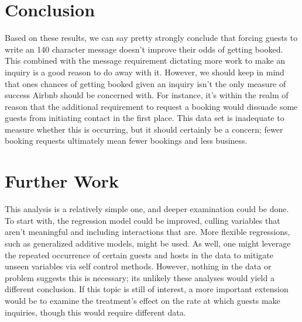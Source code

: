 \documentclass[11pt]{article}
\theoremstyle{definition}
\begin{document}
\section{Conclusion}
Based on these results, we can say pretty strongly conclude that forcing guests to write an 140 character message doesn't improve their odds of getting booked. This combined with the message requirement dictating more work to make an inquiry is a good reason to do away with it. However, we should keep in mind that ones chances of getting booked given an inquiry isn't the only measure of success Airbnb should be concerned with. For instance, it's within the realm of reason that the additional requirement to request a booking would dissuade some guests from initiating contact in the first place. This data set is inadequate to measure whether this is occurring, but it should certainly be a concern; fewer booking requests ultimately mean fewer bookings and less business.

\section{Further Work}
This analysis is a relatively simple one, and deeper examination could be done.  To start with, the regression model could be improved, culling variables that aren't meaningful and including interactions that are. More flexible regressions, such as generalized additive models, might be used. As well, one might leverage the repeated occurrence of certain guests and hosts in the data to mitigate unseen variables via self control methods. However, nothing in the data or problem suggests this is necessary; its unlikely these analyses would yield a different conclusion. If this topic is still of interest, a more important extension would be to examine the treatment's effect on the rate at which guests make inquiries, though this would require different data. 

\setlength{\voffset}{0cm}
\setlength{\hoffset}{0cm}



\setlength{\voffset}{-2.54cm}
\setlength{\hoffset}{-2.54cm}
\end{document}
